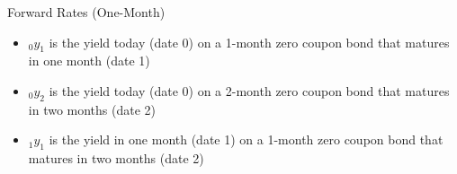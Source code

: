 \documentclass{beamer}
\begin{document}
\begin{frame}{Forward Rates (One-Month)}
	\begin{figure}[H]
		\begin{center}
		\end{center}
	\end{figure}
	\vfill
	{\small
	\begin{itemize}
		\item $_{0}y_{1}$ is the yield today (date 0) on a 1-month zero coupon bond that matures in one month (date 1)
		\item $_{0}y_{2}$ is the yield today (date 0) on a 2-month zero coupon bond that matures in two months (date 2)
		\item $_{1}y_{1}$ is the yield in one month (date 1) on a 1-month zero coupon bond that matures in two months (date 2)
	\end{itemize}
	}
\end{frame}
\end{document}
